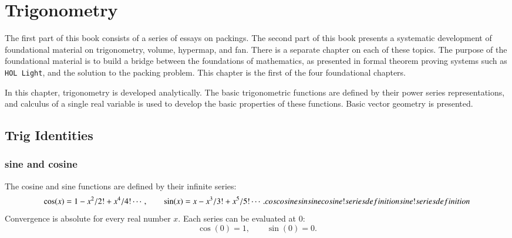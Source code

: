 
\chapter{Trigonometry}\label{part:trig}

The first part of this book consists of a series of essays
on packings.  The second part of this book presents
a systematic development of foundational material on
trigonometry, volume, hypermap, and fan.  There is a separate
chapter on each of these topics.  The purpose of the
foundational material is to build a bridge between
the foundations of mathematics, as presented in formal
theorem proving systems such as {\tt HOL Light}, and the
solution to the packing problem.  
This chapter is the first of the four foundational chapters.


In this chapter, trigonometry is developed analytically.  The basic
trigonometric functions are defined by their power series
representations, and calculus of a single real variable is used to
develop the basic properties of these functions.  Basic vector geometry is presented.

\section{Trig Identities}


\subsection{sine and cosine}

The cosine and sine functions are defined by their infinite series:%
%
    \begin{equation}\label{eqn:cos-def}\cos(x) = 1 - x^2/2! + x^4/4! \cdots,\qquad
  \sin(x) = x - x^3/3! + x^5/5! \cdots.
    \indy{Notation}{cos}
    \indy{Index}{cosine}
    \indy{Notation}{sin}
    \indy{Index}{sine}
    \indy{Index}{cosine!series definition}
    \indy{Index}{sine!series definition}
    \end{equation}
Convergence is absolute for every real number $x$.
Each series can be evaluated at $0$:
    \begin{equation}\label{eqn:cos0}
    \cos(0) = 1,\qquad \sin(0) = 0.
    \end{equation}

